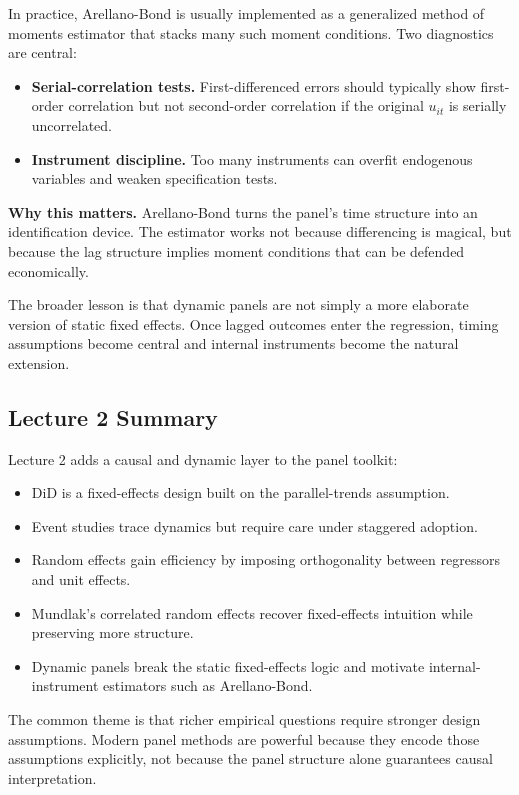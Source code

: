 In practice, Arellano-Bond is usually implemented as a generalized method of moments estimator that stacks many such moment conditions. Two diagnostics are central:
\begin{itemize}
\item \textbf{Serial-correlation tests.} First-differenced errors should typically show first-order correlation but not second-order correlation if the original $u_{it}$ is serially uncorrelated.
\item \textbf{Instrument discipline.} Too many instruments can overfit endogenous variables and weaken specification tests.
\end{itemize}

\begin{boxD}
\textbf{Why this matters.}
Arellano-Bond turns the panel's time structure into an identification device. The estimator works not because differencing is magical, but because the lag structure implies moment conditions that can be defended economically.
\end{boxD}

The broader lesson is that dynamic panels are not simply a more elaborate version of static fixed effects. Once lagged outcomes enter the regression, timing assumptions become central and internal instruments become the natural extension.

\subsection{Lecture 2 Summary}
Lecture 2 adds a causal and dynamic layer to the panel toolkit:
\begin{itemize}
\item \ac{DiD} is a fixed-effects design built on the parallel-trends assumption.
\item Event studies trace dynamics but require care under staggered adoption.
\item Random effects gain efficiency by imposing orthogonality between regressors and unit effects.
\item Mundlak's correlated random effects recover fixed-effects intuition while preserving more structure.
\item Dynamic panels break the static fixed-effects logic and motivate internal-instrument estimators such as Arellano-Bond.
\end{itemize}

The common theme is that richer empirical questions require stronger design assumptions. Modern panel methods are powerful because they encode those assumptions explicitly, not because the panel structure alone guarantees causal interpretation.

